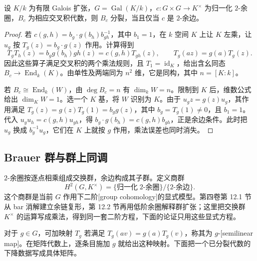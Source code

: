 \begin{proposition}\label{b2:prop:crossed-product-split-coboundary}
	设 \(K/k\) 为有限 Galois 扩张，\(G=\operatorname{Gal}(K/k)\)，\(c:G\times G\rightarrow K^\times\) 为归一化 \(2\)-余圈，\(B_c\) 为相应交叉积代数，则 \(B_c\) 分裂，当且仅当 \(c\) 是 \(2\)-余边。
\end{proposition}
\begin{proof}
	若 \(c(g,h)=b_g\cdot g(b_h)b_{gh}^{-1}\)，其中 \(b_1=1\)，在 \(k\) 空间 \(K\) 上让 \(K\) 左乘，让 \(u_g\) 按 \(T_g(z)=b_g\cdot g(z)\) 作用。计算得到
	\[
		T_gT_h(z)=b_g g(b_h)gh(z)=c(g,h)T_{gh}(z),\qquad T_g(az)=g(a)T_g(z).
	\]
	因此这些算子满足交叉积的两个乘法规则，且 \(T_1=\operatorname{id}_K\)，给出含幺同态 \(B_c\to\operatorname{End}_k(K)\)。由单性及两端同为 \(n^2\) 维，它是同构，其中 \(n=[K:k]\)。

	若 \(B_c\cong\operatorname{End}_k(W)\)，由 \(\deg B_c=n\) 有 \(\dim_k W=n\)。限制到 \(K\) 后，维数公式给出 \(\dim_KW=1\)。选一个 \(K\) 基，将 \(W\) 识别为 \(K\)。由于 \(u_g z=g(z)u_g\)，其作用满足 \(T_g(z)=g(z)T_g(1)=b_g g(z)\)，其中 \(b_g=T_g(1)\ne0\)，且 \(b_1=1\)。代入 \(u_g u_h=c(g,h)u_{gh}\)，得 \(b_g\cdot g(b_h)=c(g,h)b_{gh}\)，正是余边条件。此时把 \(u_g\) 换成 \(b_g^{-1}u_g\)，它们在 \(K\) 上就按 \(g\) 作用，乘法误差也同时消失。
\end{proof}

\subsection{Brauer 群与群上同调}
\label{b2:subsec:1804:02}

\(2\)-余圈按逐点相乘组成交换群，余边构成其子群。定义商群
\[
	H^2(G,K^\times)=\{\text{归一化}\;2\text{-余圈}\}/\{2\text{-余边}\}.
\]
这个商群是当前 \(G\) 作用下二阶[group cohomology]的显式模型。第四卷第 12.1 节从 bar 消解建立余链复形，第 12.2 节再用低阶余圈解释群扩张；这里把交换群 \(K^\times\) 的运算写成乘法，得到同一套二阶方程，下面的论证只用这些显式方程。

\ProseParagraphBreak
对于 \(g\in G\)，可加映射 \(T_g\) 若满足 \(T_g(av)=g(a)T_g(v)\)，称其为 \(g\)-[semilinear map]。在矩阵代数上，逐条目施加 \(g\) 就给出这种映射。下面把一个已分裂代数的下降数据写成具体矩阵。


